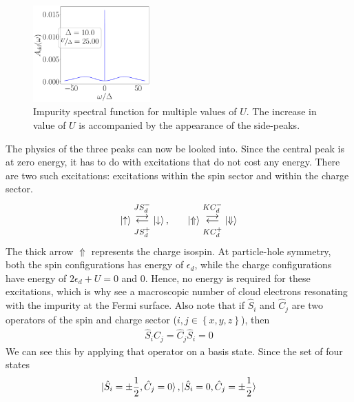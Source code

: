 \begin{figure}[!htb]
	\includegraphics[width=0.4\textwidth]{../figures/spec_func_Ub=0_U_by_delta=25.00.pdf}
	\caption{Impurity spectral function for multiple values of \(U\). The increase in value of \(U\) is accompanied by the appearance of the side-peaks.}
	\label{spec_func}
\end{figure}
The physics of the three peaks can now be looked into. Since the central peak is at zero energy, it has to do with excitations that do not cost any energy. There are two such excitations: excitations within the spin sector and within the charge sector.
\begin{equation}\begin{aligned}
	\ket{\uparrow} \mathrel{\mathlarger{\mathlarger{\mathop{\rightleftarrows}}^{J S_d^-}_{JS_d^+}}}\ket{\downarrow}, &&&&\ket{\Uparrow} \mathrel{\mathlarger{\mathlarger{\mathop{\rightleftarrows}}^{K C_d^-}_{K C_d^+}}}\ket{\Downarrow}\\
\end{aligned}\end{equation}
The thick arrow \(\Uparrow\) represents the charge isospin. At particle-hole symmetry, both the spin configurations has energy of \(\epsilon_d\), while the charge configurations have energy of \(2\epsilon_d + U=0\) and 0. Hence, no energy is required for these excitations, which is why see a macroscopic number of cloud electrons resonating with the impurity at the Fermi surface. Also note that if \(\hat S_i\) and \(\hat C_j\) are two operators of the spin and charge sector (\(i,j \in \left\{ x,y,z \right\} \)), then
\begin{equation}\begin{aligned}
	\hat S_i \hat C_j = \hat C_j \hat S_i = 0
\end{aligned}\end{equation}
We can see this by applying that operator on a basis state. Since the set of four states 
\begin{equation}\begin{aligned}
	\ket{\hat S_i = \pm \frac{1}{2}, \hat C_j = 0}, \ket{\hat S_i = 0, \hat C_j = \pm\frac{1}{2}}
\end{aligned}\end{equation}
